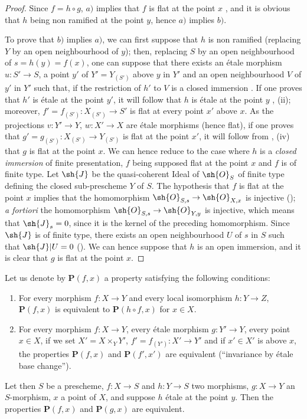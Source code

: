 \begin{proof}
Since $f=h\circ g$, $a)$ implies that $f$ is flat at the point $x$ , and it is obvious that $h$ being non ramified at the point $y$, hence $a)$ implies $b)$.

To prove that $b)$ implies $a)$, we can first suppose that $h$ is non ramified (replacing $Y$ by an open neighbourhood of $y$);
then, replacing $S$ by an open neighbourhood of $s=h(y)=f(x)$, one can suppose that there exists an \'etale morphism $u:S'\to S$, a point $y'$ of $Y'=Y_{(S')}$ above $y$ in $Y'$ and an open neighbourhood $V$ of $y'$ in $Y'$ such that, if the restriction of $h'$ to $V$ is a closed immersion .
If one proves that $h'$ is \'etale at the point $y'$, it will follow that $h$ is \'etale at the point $y$ , (ii);
moreover, $f'=f_{(S')}:X_{(S')}\to S'$ is flat at every point $x'$ above $x$.
As the projections $v:Y'\to Y$, $w:X'\to X$ are \'etale morphisms (hence flat), if one proves that $g'=g_{(S')}:X_{(S')}\to Y_{(S')}$ is flat at the point $x'$, it will follow from , (iv) that $g$ is flat at the point $x$.
We can hence reduce to the case where $h$ is a \emph{closed immersion}
of finite presentation, $f$ being supposed flat at the point $x$ and $f$ is of finite type.
Let $\sh{J}$ be the quasi-coherent Ideal of $\sh{O}_S$ of finite type defining the closed sub-prescheme $Y$ of $S$.
The hypothesis that $f$ is flat at the point $x$ implies that the homomorphism $\sh{O}_{S,s}\to\sh{O}_{X,x}$ is injective ();
\emph{a fortiori} the homomorphism $\sh{O}_{S,s}\to\sh{O}_{Y,y}$ is injective, which means that $\sh{J}_s=0$, since it is the kernel of the preceding homomorphism.
Since $\sh{J}$ is of finite type, there exists an open neighbourhood $U$ of $s$ in $S$ such that $\sh{J}|U=0$ ().
We can hence suppose that $h$ is an open immersion, and it is clear that $g$ is flat at the point $x$.
\end{proof}

\begin{proposition}[18.4.10]
\label{IV.18.4.10}
Let us denote by $\mathbf{P}(f,x)$ a property satisfying the following conditions:
\begin{enumerate}
  \item[$1^\circ$] For every morphism $f:X\to Y$ and every local isomorphism $h:Y\to Z$, $\mathbf{P}(f,x)$ is equivalent to $\mathbf{P}(h\circ f,x)$ for $x\in X$.
  \item[$2^\circ$] For every morphism $f:X\to Y$, every \'etale morphism $g:Y'\to Y$, every point $x\in X$, if we set $X'=X\times_Y Y'$, $f'=f_{(Y')}:X'\to Y'$ and if $x'\in X'$ is above $x$, the properties $\mathbf{P}(f,x)$ and $\mathbf{P}(f',x')$ are equivalent (``invariance by \'etale base change'').
\end{enumerate}
Let then $S$ be a prescheme, $f:X\to S$ and $h:Y\to S$ two morphisms, $g:X\to Y$ an $S$-morphism, $x$ a point of $X$, and suppose $h$ \'etale at the point $y$.
Then the properties $\mathbf{P}(f,x)$ and $\mathbf{P}(g,x)$ are equivalent.
\end{proposition}

